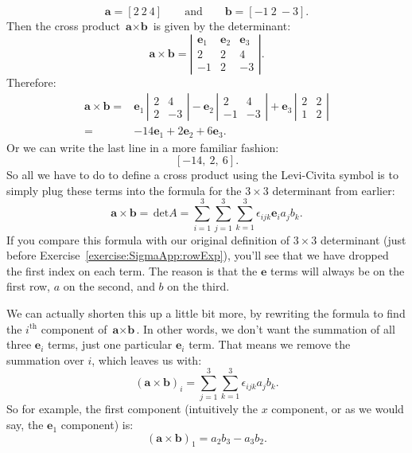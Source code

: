 \[ \textbf{a}= [2~ 2~ 4] \qquad \text{and} \qquad \textbf{b}=[-1~2~-3]. \]
Then the cross product $\textbf{a} \times \textbf{b}$ is given by the determinant:
\[ \textbf{a} \times \textbf{b} =
 \left| \begin{array}{ccc}
\textbf{e}_1 & \textbf{e}_2  & \textbf{e}_3  \\
2 & 2 & 4\\
-1 & 2 & -3 \end{array} \right|.\] 
Therefore:
\begin{align*}
\textbf{a} \times \textbf{b} =& \textbf{e}_1 \,
 \left| \begin{array}{cc}
2 & 4 \\
2 & -3  \end{array} \right| - \textbf{e}_2 \,
 \left| \begin{array}{cc}
2 & 4 \\
-1 & -3  \end{array} \right| + \textbf{e}_3 \,
 \left| \begin{array}{cc}
2 & 2 \\
1 & 2  \end{array} \right| \\
=& -14 \textbf{e}_1 + 2 \textbf{e}_2 + 6 \textbf{e}_3.
\end{align*}
Or we can write the last line in a more familiar fashion:
\[ [-14, ~ 2, ~ 6]. \] 
So all we have to do to define a cross product using the Levi-Civita symbol is to simply plug these terms into the formula for the $3 \times 3$ determinant from earlier:
\[\textbf{a} \times \textbf{b} = \,\text{det} A = \sum_{i=1}^3 \sum_{j=1}^3 \sum_{k=1}^3 \epsilon_{ijk} \textbf{e}_i  a_j b_k. \]
If you compare this formula with our original definition of $3 \times 3$ determinant (just before Exercise~\ref{exercise:SigmaApp:rowExp}), you'll see  that we have dropped the first index on each term.  The reason is that the $\textbf{e}$ terms will always be on the first row, $a$ on the second, and $b$ on the third.  

We can actually shorten this up a little bit more, by rewriting the formula to find the $i^{\text{th}}$ component of $\textbf{a} \times \textbf{b}$.  In other words, we don't want the summation of all three $\textbf{e}_i$ terms, just one particular $\textbf{e}_i$ term.  That means we remove the summation over $i$, which leaves us with:
\[ (\textbf{a} \times \textbf{b})_i = \sum_{j=1}^3 \sum_{k=1}^3 \epsilon_{ijk} a_j b_k. \]
So for example, the first component (intuitively the $x$ component, or as we would say, the $\textbf{e}_1$ component) is:
\[ (\textbf{a} \times \textbf{b})_1 = a_2 b_3 - a_3 b_2. \]

